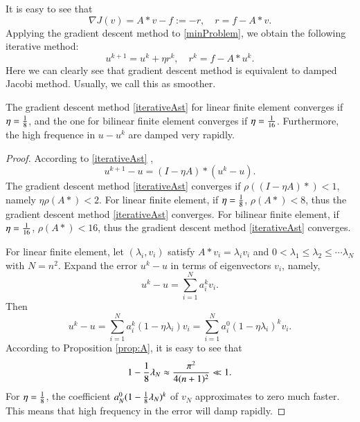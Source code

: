 It is easy to see that 
$$
\nabla J(v)= A\ast v - f := - r,\quad r=f-A\ast v.
$$
Applying the gradient descent method to \eqref{minProblem}, we obtain the following iterative method: 
\begin{equation}\label{iterativeAst}
u^{k+1} = u^k + \eta r^k,\quad r^k = f-A\ast u^k.
\end{equation}
Here we can clearly see that gradient descent method is equivalent to
damped Jacobi method. Usually, we call this as smoother. 
\begin{lemma}
The gradient descent method \eqref{iterativeAst} for linear finite element converges if $\eta={1\over 8} %
$, and the one for bilinear finite element converges  if $\eta={1\over 16}%
$. Furthermore, the high frequence in $u-u^k$ are damped very rapidly. 
\end{lemma}
\begin{proof}
According to \eqref{iterativeAst} ,
$$
u^{k+1}-u=(I-\eta A)\ast (u^k-u).
$$
The gradient descent method \eqref{iterativeAst} converges if $\rho((I-\eta A)\ast)<1$, namely $\eta\rho(A\ast)<2$. For linear finite element, if $\eta= {1\over 8}$, $\rho(A\ast )<8$, thus the gradient descent method \eqref{iterativeAst} converges.
For bilinear finite element, if $\eta= {1\over 16}$, $\rho(A\ast )<16$, thus the gradient descent method \eqref{iterativeAst} converges.

For linear finite element, let $(\lambda_i, v_i)$ satisfy $A\ast v_i=\lambda_i v_i$ and $0<\lambda_1\leq \lambda_2\leq\cdots\lambda_{N}$ with $N=n^2$. Expand the error $u^k-u$ in terms of eigenvectors $v_i$, namely,
$$
u^k-u=\sum_{i=1}^{N} a_i^kv_i.
$$
Then
$$
u^{k}-u=\sum_{i=1}^{N} a_i^k(1-\eta \lambda_i)v_i=\sum_{i=1}^{N} a_i^0(1-\eta \lambda_i)^{k}v_i.
$$
According to Proposition \ref{prop:A}, it is easy to see that 
$$
1-{1\over 8}\lambda_N\approx {\pi^2\over 4(n+1)^2} \ll 1.
$$
For $\eta={1\over 8}$, the coefficient $a_N^0(1-{1\over 8} \lambda_N)^{k}$ of $v_N$ approximates to zero much faster. This means that high frequency in the error will damp rapidly.
\end{proof}

